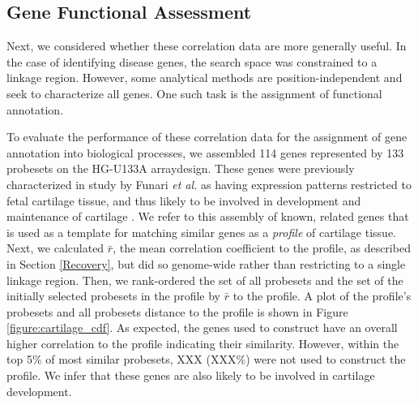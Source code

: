 \documentclass{bioinfo}
\begin{document}



\subsection{Gene Functional Assessment}

Next, we considered whether these correlation data are more generally useful.
In the case of identifying disease genes, the search space was constrained to a
linkage region.  However, some analytical methods are position-independent and
seek to characterize all genes.  One such task is the assignment of functional
annotation.

To evaluate the performance of these correlation data for the assignment of
gene annotation into biological processes, we assembled 114 genes represented
by 133 probesets on the HG-U133A arraydesign.  These genes were previously
characterized in study by Funari \emph{et al.} as having expression patterns
restricted to fetal cartilage tissue, and thus likely to be involved in
development and maintenance of cartilage \cite{funari}.   We refer to this
assembly of known, related genes that is used as a template for matching
similar genes as a \emph{profile} of cartilage tissue.  Next, we calculated
$\bar{r}$, the mean correlation coefficient to the profile, as described in
Section \ref{Recovery}, but did so genome-wide rather than restricting to a
single linkage region.  Then, we rank-ordered the set of all probesets and the
set of the initially selected probesets in the profile by $\bar{r}$ to the
profile.  A plot of the profile's probesets and all probesets distance to the
profile is shown in Figure \ref{figure:cartilage_cdf}.  As expected, the genes
used to construct have an overall higher correlation to the profile indicating
their similarity.  However, within the top 5\% of most similar probesets, XXX
(XXX\%) were not used to construct the profile.  We infer that these genes are
also likely to be involved in cartilage development.
\end{document}
